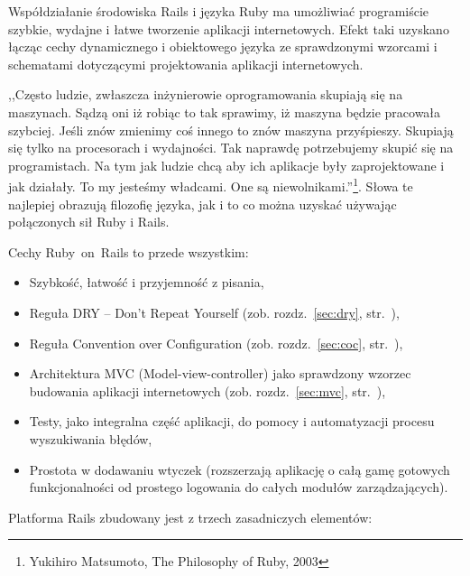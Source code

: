 \documentclass[a4paper,12pt,oneside]{report}
\begin{document}
Współdziałanie środowiska Rails i języka Ruby ma umożliwiać programiście szybkie, wydajne i łatwe tworzenie aplikacji internetowych. Efekt taki uzyskano łącząc cechy dynamicznego i obiektowego języka ze sprawdzonymi wzorcami i schematami dotyczącymi projektowania aplikacji internetowych.

,,Często ludzie, zwłaszcza inżynierowie oprogramowania skupiają się na maszynach. Sądzą oni iż robiąc to tak sprawimy, iż maszyna będzie pracowała szybciej. Jeśli znów zmienimy coś innego to znów maszyna przyśpieszy. Skupiają się tylko na procesorach i wydajności. Tak naprawdę potrzebujemy skupić się na programistach. Na tym jak ludzie chcą aby ich aplikacje były zaprojektowane i jak działały. To my jesteśmy władcami. One są niewolnikami.”\footnote{Yukihiro Matsumoto, The Philosophy of Ruby, 2003}. Słowa te najlepiej obrazują filozofię języka, jak i to co można uzyskać używając połączonych sił Ruby i Rails. 

Cechy Ruby~on~Rails to przede wszystkim:
\begin{itemize}
  \item Szybkość, łatwość i przyjemność z pisania,
  \item Reguła DRY -- Don't Repeat Yourself (zob. rozdz.~\ref{sec:dry}, str.~\pageref{sec:dry}),
  \item Reguła Convention over Configuration (zob. rozdz.~\ref{sec:coc}, str.~\pageref{sec:coc}),
  \item Architektura MVC (Model-view-controller) jako sprawdzony wzorzec budowania aplikacji internetowych (zob. rozdz.~\ref{sec:mvc}, str.~\pageref{sec:mvc}),
  \item Testy, jako integralna część aplikacji, do pomocy i automatyzacji procesu wyszukiwania błędów,
  \item Prostota w dodawaniu wtyczek (rozszerzają aplikację o całą gamę gotowych funkcjonalności od prostego logowania do całych modułów zarządzających).
\end{itemize}

Platforma Rails zbudowany jest z trzech zasadniczych elementów:
\end{document}
